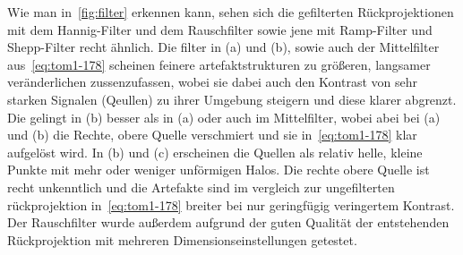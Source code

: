 \documentclass[slug=PET, room=Andreas-Schubert-Bau\,\ 424A, supervisor=Carsten\ Bittrich, coursedate=10.\ 01.\ 2020]{../../Lab_Report_LaTeX/lab_report}
\begin{document}
Wie man in~\ref{fig:filter} erkennen kann, sehen sich die gefilterten
Rückprojektionen mit dem Hannig-Filter und dem Rauschfilter sowie jene
mit Ramp-Filter und Shepp-Filter recht ähnlich. Die filter in (a) und
(b), sowie auch der Mittelfilter aus~\ref{eq:tom1-178} scheinen
feinere artefaktstrukturen zu gr\"o\ss{}eren, langsamer
ver\"anderlichen zussenzufassen, wobei sie dabei auch den Kontrast von
sehr starken Signalen (Qeullen) zu ihrer Umgebung steigern und diese
klarer abgrenzt. Die gelingt in (b) besser als in (a) oder auch im
Mittelfilter, wobei abei bei (a) und (b) die Rechte, obere Quelle
verschmiert und sie in~\ref{eq:tom1-178} klar aufgel\"ost wird. In (b)
und (c) erscheinen die Quellen als relativ helle, kleine Punkte mit
mehr oder weniger unf\"ormigen Halos. Die rechte obere Quelle ist
recht unkenntlich und die Artefakte sind im vergleich zur
ungefilterten r\"uckprojektion in~\ref{eq:tom1-178} breiter bei nur
geringf\"ugig
veringertem Kontrast. \\


Der Rauschfilter wurde außerdem aufgrund der guten Qualit\"at der
entstehenden R\"uckprojektion mit mehreren Dimensionseinstellungen getestet.
\end{document}
